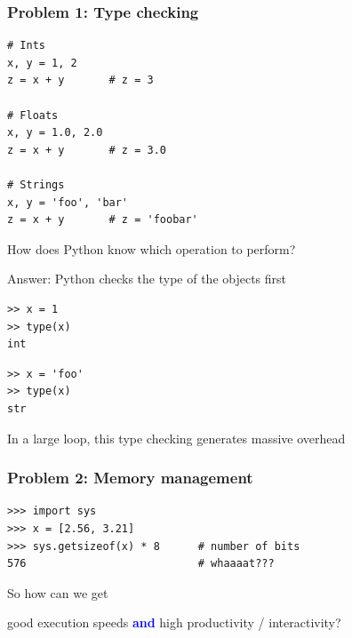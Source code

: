 \documentclass[
    xcolor={svgnames,dvipsnames},
    hyperref={colorlinks, citecolor=DeepPink4, linkcolor=DarkRed, urlcolor=DarkBlue}
    ]{beamer}  %
\newcommand{\navy}[1]{\textcolor{Blue}{\bf #1}}
\newcommand{\1}{\mathbbm 1}
\begin{document}
\begin{frame}[fragile]
    \frametitle{Problem 1: Type checking}

    \begin{verbatim}
# Ints
x, y = 1, 2
z = x + y       # z = 3

# Floats
x, y = 1.0, 2.0
z = x + y       # z = 3.0

# Strings
x, y = 'foo', 'bar'
z = x + y       # z = 'foobar'
    \end{verbatim}



\end{frame}


\begin{frame}[fragile]
    How does Python know which operation to perform?

    Answer: Python checks the type of the objects first

    \begin{verbatim}
>> x = 1
>> type(x)
int
    \end{verbatim}

    \begin{verbatim}
>> x = 'foo'
>> type(x)
str
    \end{verbatim}


    In a large loop, this type checking generates massive overhead
\end{frame}


\begin{frame}[fragile]
    \frametitle{Problem 2: Memory management}

    \begin{verbatim}
>>> import sys
>>> x = [2.56, 3.21]
>>> sys.getsizeof(x) * 8      # number of bits
576                           # whaaaat???
    \end{verbatim}


\end{frame}


\begin{frame}
    
    So how can we get 

    \begin{center}
    good execution speeds \navy{and} high productivity / interactivity?
    \end{center}

\end{frame}
\end{document}
